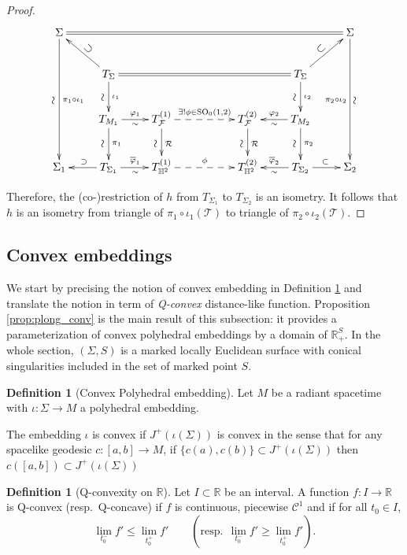 \documentclass[a4paper,12pt]{article}
\def\H{\mathbb{H}}
\def\GGL{\SO_0(1,2)}
\def\TT{\mathcal T}
\def\R{\mathbb{R}}
\def\SO{\mathrm{SO}}
\def\RR{\mathbb{R}}
\def\SO{\mathrm{SO}}
\def\R{\mathcal R}
\def\Future{\mathcal F}
\theoremstyle{definition}
\newtheorem{defi}[lem]{Definition}	%
\begin{document}
\begin{proof}
						
						
						$$
						\xymatrix{
						\Sigma\ar[ddd]^{\pi_1\circ\iota_1}_{\rotatebox{90}{$\sim$}}\ar@{=}[rrrrrr]&&&&&&\Sigma\ar[ddd]_{\pi_2\circ \iota_2}^{\rotatebox{90}{$\sim$}}
						\\&T_{\Sigma}\ar[ul]_*-{\rotatebox{-45}{$\supset$}} \ar[d]_{\rotatebox{90}{$\sim$}}^{\iota_1}\ar@{=}[rrrr]&&&&T_{\Sigma}\ar[d]_{\rotatebox{90}{$\sim$}}^{\iota_2}\ar[ur]^*-{\rotatebox{45}{$\subset$}}&
						\\& T_{M_1}\ar[d]_{\rotatebox{90}{$\sim$}}^{\pi_1}\ar[r]_{\sim}^{\varphi_1}& T_{\Future}^{(1)} \ar[d]_{\rotatebox{90}{$\sim$}}^{\R} \ar@{-->}[rr]^{\exists!\phi \in \GGL}
						&&T_{\Future}^{(2)} \ar[d]_{\rotatebox{90}{$\sim$}}^{\R}&T_{M_2}\ar[d]_{\rotatebox{90}{$\sim$}}^{\pi_2}\ar[l]^{\sim}_{\varphi_2}&
						\\ \Sigma_1&\ar[l]_{\supset}T_{\Sigma_1} \ar[r]_{\sim}^{\overline\varphi_1}& T^{(1)}_{\H^2} \ar@{-->}[rr]^\phi
						&& T^{(2)}_{\H^2}&T_{\Sigma_2} \ar[l]^{\sim}_{\overline\varphi_2} \ar[r]^\subset& \Sigma_2
						}
						$$
						
						Therefore, the (co-)restriction of $h$ from $T_{\Sigma_1}$ to $T_{\Sigma_2}$ is an isometry. It follows that $h$ is an isometry from triangle of $\pi_1\circ \iota_1(\TT)$ to triangle of $\pi_2\circ\iota_2(\TT)$.\end{proof}


				\subsection{Convex embeddings}

					We start by precising the notion of convex embedding in Definition \ref{defi:plong_conv} and translate the notion in term of {\it Q-convex} distance-like function.
					Proposition \ref{prop:plong_conv} is the main result of this subsection: it provides 
					a parameterization of convex polyhedral embeddings by a domain of $\RR_+^S$.
					In the whole section, $(\Sigma, S)$ is a marked locally Euclidean surface with conical singularities included in the set of marked point $S$.

					\begin{defi}[Convex Polyhedral embedding] \label{defi:plong_conv}
						Let $M$ be a radiant spacetime with $\iota:\Sigma\rightarrow M$ a polyhedral embedding.

						The embedding $\iota$ is convex if $J^+(\iota(\Sigma))$ is convex in the sense that for any spacelike geodesic $c:[a,b]\rightarrow M$, if $\{c(a),c(b)\}\subset J^+(\iota(\Sigma))$ then 
						$c([a,b]) \subset J^+(\iota(\Sigma))$

					\end{defi}
					\begin{defi}[Q-convexity on $\RR$]\label{def:q_convexity} Let $I\subset \RR$ be an interval.
						A function $f: I \rightarrow \RR$ is Q-convex (resp.\ Q-concave)
						if $f$ is continuous, piecewise $\mathscr{C}^1$ and if for all $t_0\in I$,
						$$\lim_{t_0^-}f' \leq \lim_{t_0^+} f'\quad\quad \left( \mathrm{resp.}~~ \lim_{t_0^-}f' \geq \lim_{t_0^+} f'\right).$$
					\end{defi}
\end{document}
